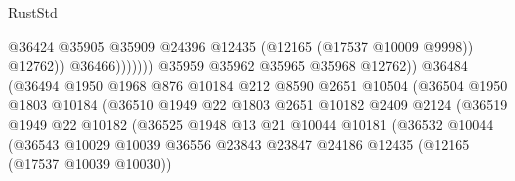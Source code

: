 \begin{lexlean}{RustStd}
\begin{coremodule}
                                                    @36424
                                                    @35905
                                                    @35909
                                                    @24396
                                                    @12435
                                                    (@12165 (@17537 @10009 @9998))
                                                    @12762))
                                                @36466)))))))
                                  @35959
                                  @35962
                                  @35965
                                  @35968
                                  @12762))
                              @36484
                              (@36494
                                @1950
                                @1968
                                @876
                                @10184
                                @212
                                @8590
                                @2651
                                @10504
                                (@36504
                                  @1950
                                  @1803
                                  @10184
                                  (@36510
                                    @1949
                                    @22
                                    @1803
                                    @2651
                                    @10182
                                    @2409
                                    @2124
                                    (@36519
                                      @1949
                                      @22
                                      @10182
                                      (@36525
                                        @1948
                                        @13
                                        @21
                                        @10044
                                        @10181
                                        (@36532
                                          @10044
                                          (@36543
                                            @10029
                                            @10039
                                            @36556
                                            @23843
                                            @23847
                                            @24186
                                            @12435
                                            (@12165 (@17537 @10039 @10030))

\end{coremodule}
\end{lexlean}
